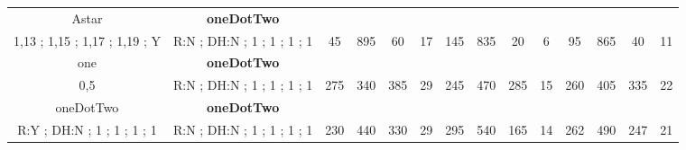 \begin{table}[]
{\begin{tabular}{|c|c|c|c|c|c|c|c|c|c|c|c|c|c|}
Astar & \cellcolor{blue!15}\textbf{oneDotTwo}& {\color[HTML]{00009B} } & {\color[HTML]{9A0000} } & {\color[HTML]{009901} } &  & {\color[HTML]{00009B} } & {\color[HTML]{9A0000} } & {\color[HTML]{009901} } &  & {\color[HTML]{00009B} } & {\color[HTML]{9A0000} } & {\color[HTML]{009901} } &  \\ 
1,13 ; 1,15 ; 1,17 ; 1,19 ; Y & \cellcolor{ blue!15}R:N ; DH:N ; 1 ; 1 ; 1 ; 1 & \multirow{-2}{*}{{\color[HTML]{00009B} 45}} & \multirow{-2}{*}{{\color[HTML]{9A0000} 895}} & \multirow{-2}{*}{{\color[HTML]{009901} 60}} & \multirow{-2}{*}{17} & \multirow{-2}{*}{{\color[HTML]{00009B} 145}} & \multirow{-2}{*}{{\color[HTML]{9A0000} 835}} & \multirow{-2}{*}{{\color[HTML]{009901} 20}} & \multirow{-2}{*}{6} & \multirow{-2}{*}{{\color[HTML]{00009B} 95}} & \multirow{-2}{*}{{\color[HTML]{9A0000} 865}} & \multirow{-2}{*}{{\color[HTML]{009901} 40}} & \multirow{-2}{*}{11} \\ \hline

one & \cellcolor{blue!15}\textbf{oneDotTwo}& {\color[HTML]{00009B} } & {\color[HTML]{9A0000} } & {\color[HTML]{009901} } &  & {\color[HTML]{00009B} } & {\color[HTML]{9A0000} } & {\color[HTML]{009901} } &  & {\color[HTML]{00009B} } & {\color[HTML]{9A0000} } & {\color[HTML]{009901} } &  \\ 
0,5 & \cellcolor{ blue!15}R:N ; DH:N ; 1 ; 1 ; 1 ; 1 & \multirow{-2}{*}{{\color[HTML]{00009B} 275}} & \multirow{-2}{*}{{\color[HTML]{9A0000} 340}} & \multirow{-2}{*}{{\color[HTML]{009901} 385}} & \multirow{-2}{*}{29} & \multirow{-2}{*}{{\color[HTML]{00009B} 245}} & \multirow{-2}{*}{{\color[HTML]{9A0000} 470}} & \multirow{-2}{*}{{\color[HTML]{009901} 285}} & \multirow{-2}{*}{15} & \multirow{-2}{*}{{\color[HTML]{00009B} 260}} & \multirow{-2}{*}{{\color[HTML]{9A0000} 405}} & \multirow{-2}{*}{{\color[HTML]{009901} 335}} & \multirow{-2}{*}{22} \\ \hline

oneDotTwo & \cellcolor{blue!15}\textbf{oneDotTwo}& {\color[HTML]{00009B} } & {\color[HTML]{9A0000} } & {\color[HTML]{009901} } &  & {\color[HTML]{00009B} } & {\color[HTML]{9A0000} } & {\color[HTML]{009901} } &  & {\color[HTML]{00009B} } & {\color[HTML]{9A0000} } & {\color[HTML]{009901} } &  \\ 
R:Y ; DH:N ; 1 ; 1 ; 1 ; 1 & \cellcolor{ blue!15}R:N ; DH:N ; 1 ; 1 ; 1 ; 1 & \multirow{-2}{*}{{\color[HTML]{00009B} 230}} & \multirow{-2}{*}{{\color[HTML]{9A0000} 440}} & \multirow{-2}{*}{{\color[HTML]{009901} 330}} & \multirow{-2}{*}{29} & \multirow{-2}{*}{{\color[HTML]{00009B} 295}} & \multirow{-2}{*}{{\color[HTML]{9A0000} 540}} & \multirow{-2}{*}{{\color[HTML]{009901} 165}} & \multirow{-2}{*}{14} & \multirow{-2}{*}{{\color[HTML]{00009B} 262}} & \multirow{-2}{*}{{\color[HTML]{9A0000} 490}} & \multirow{-2}{*}{{\color[HTML]{009901} 247}} & \multirow{-2}{*}{21} \\ \hline


\end{tabular}}
\end{table}

